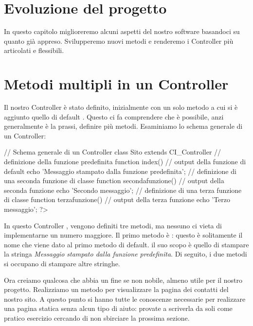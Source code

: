 \section{Evoluzione del progetto}
\label{cap:evoluzione}

In questo capitolo miglioreremo alcuni aspetti del nostro software basandoci su quanto già appreso. Svilupperemo nuovi metodi e renderemo i Controller più articolati e flessibili.

\section*{Metodi multipli in un Controller}
Il nostro Controller  è stato definito, inizialmente con un solo metodo  a cui si è aggiunto quello di default . Questo ci fa comprendere che è possibile, anzi generalmente è la prassi, definire più metodi. Esaminiamo lo schema generale di un Controller:

\begin{code}
// Schema generale di un Controller
class Sito extends CI_Controller {
  // definizione della funzione predefinita
  function index() {
    // output della funzione di default 
    echo 'Messaggio stampato dalla funzione predefinita';
  }
  // definizione di una seconda funzione di classe
  function secondafunzione() {
    // output della seconda funzione 
    echo 'Secondo messaggio';
  }
  // definizione di una terza funzione di classe
  function terzafunzione() {
    // output della terza funzione 
    echo 'Terzo messaggio';
  }
}
?>
\end{code}

In questo Controller , vengono definiti tre metodi, ma nessuno ci vieta di implementarne un numero maggiore. Il primo metodo è : questo è solitamente il nome che viene dato al primo metodo di default. il suo scopo è quello di stampare la stringa \emph{Messaggio stampato dalla funzione predefinita}. Di seguito, i due metodi si occupano di stampare altre stringhe.

Ora creiamo qualcosa che abbia un fine se non nobile, almeno utile per il nostro progetto. Realizziamo un metodo per visualizzare la pagina dei contatti del nostro sito. A questo punto si hanno tutte le conoscenze necessarie per realizzare una pagina statica senza alcun tipo di aiuto: provate a scriverla da soli come pratico esercizio cercando di non sbirciare la prossima sezione.

